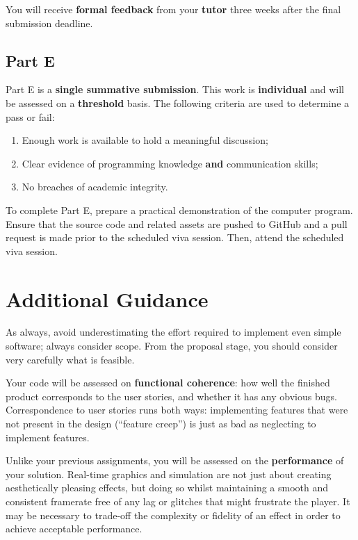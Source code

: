 \documentclass{../../fal_assignment}
\begin{document}
You will receive \textbf{formal feedback} from your \textbf{tutor} three weeks after the final submission deadline.

\subsection*{Part E}

Part E is a \textbf{single summative submission}. This work is \textbf{individual} and will be assessed on a \textbf{threshold} basis.  The following criteria are used to determine a pass or fail:

\begin{enumerate}[label=(\alph*)]
	\item Enough work is available to hold a meaningful discussion;
	\item Clear evidence of programming knowledge \textbf{and} communication skills;
	\item No breaches of academic integrity.
\end{enumerate}

To complete Part E, prepare a practical demonstration of the computer program. Ensure that the source code and related assets are pushed to GitHub and a pull request is made prior to the scheduled viva session. Then, attend the scheduled viva session.

\section*{Additional Guidance}

As always, avoid underestimating the effort required to implement even simple software; always consider scope.
From the proposal stage, you should consider very carefully what is feasible.

Your code will be assessed on \textbf{functional coherence}:
how well the finished product corresponds to the user stories,
and whether it has any obvious bugs.
Correspondence to user stories runs both ways:
implementing features that were not present in the design (``feature creep'')
is just as bad as neglecting to implement features.

Unlike your previous assignments,
you will be assessed on the \textbf{performance} of your solution.
Real-time graphics and simulation are not just about creating aesthetically pleasing effects,
but doing so whilst maintaining a smooth and consistent framerate free of any lag or glitches that might frustrate the player.
It may be necessary to trade-off the complexity or fidelity of an effect
in order to achieve acceptable performance.
\end{document}
